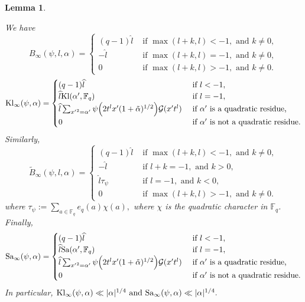 \documentclass[10pt]{amsart}
\theoremstyle{plain}
\theoremstyle{plain}
\newtheorem{lemma}[theorem]{Lemma}
\theoremstyle{remark}
\theoremstyle{definition}
\newcommand{\hl}{\widehat l}
\newcommand{\Kl}{\textup{Kl}}
\newcommand{\Sa}{\textup{Sa}}
\newcommand{\FF}{\mathbb{F}}
\newcommand{\cG}{\mathcal{G}}
\begin{document}
\begin{lemma}\label{Bessel}












We have 
\[
B_{\infty}(\psi,l,\alpha)=\begin{cases} 
(q-1)\hl &\text{ if } \max(l+k,l)<-1, \text{ and } k\neq 0,
 \\
-\hl &\text{ if } \max(l+k,l)=-1, \text{ and } k\neq 0,
\\
0   &\text{ if } \max(l+k,l)>-1, \text{ and } k\neq 0. \end{cases}
\]
\[
\Kl_{\infty}(\psi,\alpha)=\begin{cases} 
(q-1)\hl &\text{ if } l<-1,
\\
\hl \Kl(\alpha^{\prime},\FF_q) &\text{ if } l=-1,
\\
\hl\sum_{{x^{\prime}}^2= \alpha^{\prime}}  \psi\Big(2t^{l}x^{\prime}(1+\tilde{\alpha})^{1/2} \Big) \cG(x^{\prime}t^l)   &\text{ if } \alpha^{\prime} \text{ is a quadratic residue,}
\\
0   &\text{ if } \alpha^{\prime} \text{ is not a quadratic residue.} \end{cases}
\]
Similarly,  
\[
\widetilde{B}_{\infty}(\psi,l,\alpha)=\begin{cases} 
(q-1)\hl &\text{ if } \max(l+k,l)<-1, \text{ and } k\neq 0,
 \\
-\hl &\text{ if } l+k=-1, \text{ and } k> 0,
\\
\hl \tau_{\psi} &\text{ if } l=-1, \text{ and } k< 0,
\\
0   &\text{ if } \max(l+k,l)>-1, \text{ and } k\neq 0. \end{cases}
\]
where $\tau_{\psi}:=\sum_{a\in \FF_q}e_q(a)\chi(a),$ where $\chi$ is the quadratic character in $\FF_q$. Finally,
\[
\Sa_{\infty}(\psi,\alpha)=\begin{cases} 
(q-1)\hl &\text{ if } l<-1,
\\
\hl \Sa(\alpha^{\prime},\FF_q) &\text{ if } l=-1,
\\
\hl\sum_{{x^{\prime}}^2= \alpha^{\prime}}  \psi\Big(2t^{l}x^{\prime}(1+\tilde{\alpha})^{1/2} \Big) \cG(x^{\prime}t^l)   &\text{ if } \alpha^{\prime} \text{ is a quadratic residue,}
\\
0   &\text{ if } \alpha^{\prime} \text{ is not a quadratic residue.} \end{cases}
\]
In particular, 
 \(
 \Kl_{\infty}(\psi,\alpha) \ll |\alpha|^{1/4} \text { and } \Sa_{\infty}(\psi,\alpha)  \ll |\alpha|^{1/4}.
 \)  
\end{lemma}
\end{document}
